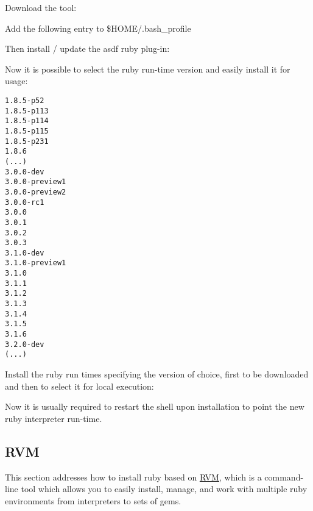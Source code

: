 \documentclass[dec_sum_main.tex]{subfiles}
\begin{document}
\par
\noindent
Download the tool:

  \newline

Add the following entry to \$HOME/.bash\_profile 

  \newline


\par
\noindent
Then install / update the asdf ruby plug-in:

 \newline
\par
{} \newline


\par
\noindent
Now it is possible to select the ruby run-time version and easily install it for usage:\newline


\begin{Verbatim}
1.8.5-p52
1.8.5-p113
1.8.5-p114
1.8.5-p115
1.8.5-p231
1.8.6
(...)
3.0.0-dev
3.0.0-preview1
3.0.0-preview2
3.0.0-rc1
3.0.0
3.0.1
3.0.2
3.0.3
3.1.0-dev
3.1.0-preview1
3.1.0
3.1.1
3.1.2
3.1.3
3.1.4
3.1.5
3.1.6
3.2.0-dev
(...)
\end{Verbatim}


\par
\noindent
Install the ruby run times specifying the version of choice, first to be downloaded and then to select it for local execution:\newline

 \newline

\par
{}\newline

\par
\noindent
Now it is usually required to restart the shell upon  installation to point the new ruby interpreter run-time.

\subsection{RVM}
\par
\noindent
This section addresses how to install ruby based on \href{https://rvm.io/}{RVM}, which is a command-line tool which allows you to easily install, manage, and work with multiple ruby environments from interpreters to sets of gems. \newline
\end{document}
